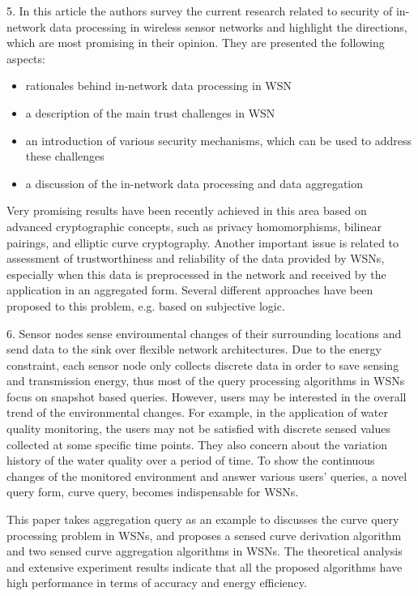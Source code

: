 5. In this article the authors survey the current research related to security of in-network data processing in wireless sensor networks and highlight the directions, which are most promising in their opinion. They are presented the following aspects:

\begin{itemize}
    \item rationales behind in-network data processing in WSN
    \item a description of the main trust challenges in WSN
    \item an introduction of various security mechanisms, which can be used to address these challenges 
    \item a discussion of the in-network data processing and data aggregation
\end{itemize}
\smallskip

Very promising results have been recently achieved in this area based on advanced cryptographic concepts, such as privacy homomorphisms, bilinear pairings, and elliptic curve cryptography. Another important issue is related to assessment of trustworthiness and reliability of the data provided by WSNs, especially when this data is preprocessed in the network and received by the application in an aggregated form. Several different approaches have been proposed to this problem, e.g. based on subjective logic.
\smallskip

6. Sensor nodes sense environmental changes of their surrounding locations and send data to the sink over flexible network architectures. Due to the energy constraint, each sensor node only collects discrete data in order to save sensing and transmission energy, thus most of the query processing algorithms in WSNs focus on snapshot based queries. However, users may be interested in the overall trend of the environmental changes. For example, in the application of water quality monitoring, the users may not be satisfied with discrete sensed values collected at some specific time points. They also concern about the variation history of the water quality over a period of time. To show the continuous changes of the monitored environment and answer various users’ queries, a novel query form, curve query, becomes indispensable for WSNs.
\smallskip

This paper takes aggregation query as an example to discusses the curve query processing problem in WSNs, and proposes a sensed curve derivation algorithm and two sensed curve aggregation algorithms in WSNs. The theoretical analysis and extensive experiment results indicate that all the proposed algorithms have high performance in terms of accuracy and energy efficiency.

